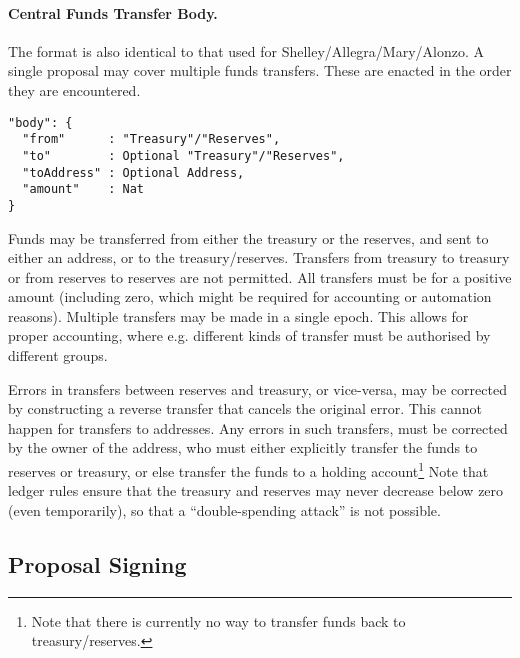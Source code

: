 
\paragraph{Central Funds Transfer Body.}  The format is also identical to that used for Shelley/Allegra/Mary/Alonzo.
A single proposal may cover multiple funds transfers.  These are enacted in the order they are encountered.

\begin{verbatim}
"body": {
  "from"      : "Treasury"/"Reserves",
  "to"        : Optional "Treasury"/"Reserves",
  "toAddress" : Optional Address,
  "amount"    : Nat
}
\end{verbatim}

Funds may be transferred from either the treasury or the reserves, and sent to either an address, or to the treasury/reserves.
Transfers from treasury to treasury or from reserves to reserves are not permitted.  All transfers must be for a positive amount (including zero, which might be required for accounting or automation reasons). %
Multiple transfers may be made in a single epoch.  This allows for proper accounting, where e.g. different kinds of transfer must
be authorised by different groups.

Errors in transfers between reserves and treasury, or vice-versa, may be corrected by constructing a reverse transfer that cancels the original error.
This cannot happen for transfers to addresses.  Any errors in such transfers, must be corrected by the owner of the address, who must either explicitly transfer
the funds to reserves or treasury, or else transfer the funds to a holding account\footnote{Note that there is currently no way to transfer funds back to treasury/reserves.}
Note that ledger rules ensure that the treasury and reserves may never decrease below zero (even temporarily), so that a ``double-spending attack'' is not possible.

\subsection{Proposal Signing}

